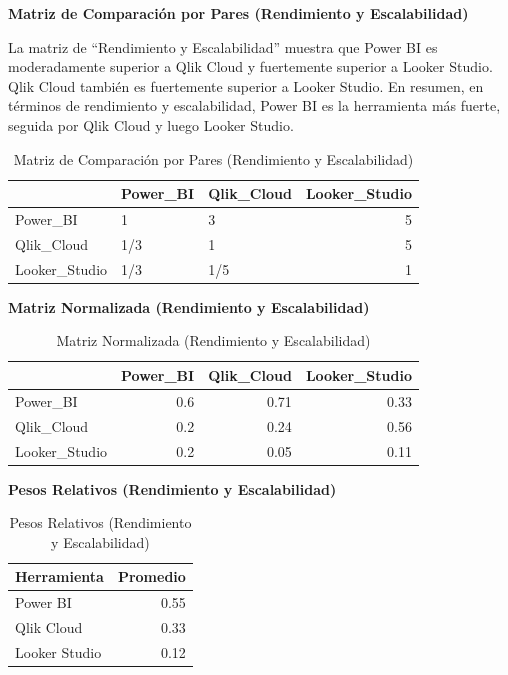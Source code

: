 \documentclass[
  11pt,
  bookmarksnumbered]{article}
\begin{document}
\textbf{Matriz de Comparación por Pares (Rendimiento y Escalabilidad)}

La matriz de ``Rendimiento y Escalabilidad'' muestra que Power BI es moderadamente superior a Qlik Cloud y fuertemente superior a Looker Studio. Qlik Cloud también es fuertemente superior a Looker Studio. En resumen, en términos de rendimiento y escalabilidad, Power BI es la herramienta más fuerte, seguida por Qlik Cloud y luego Looker Studio.

\begin{table}[H]

\caption{\label{tab:unnamed-chunk-45}Matriz de Comparación por Pares (Rendimiento y Escalabilidad)}
\centering
\fontsize{12}{14}\selectfont
\begin{tabular}[t]{l|l|l|r}
\hline
  & Power\_BI & Qlik\_Cloud & Looker\_Studio\\
\hline
Power\_BI & 1 & 3 & 5\\
\hline
Qlik\_Cloud & 1/3 & 1 & 5\\
\hline
Looker\_Studio & 1/3 & 1/5 & 1\\
\hline
\end{tabular}
\end{table}

\textbf{Matriz Normalizada (Rendimiento y Escalabilidad)}

\begin{table}[H]

\caption{\label{tab:unnamed-chunk-46}Matriz Normalizada (Rendimiento y Escalabilidad)}
\centering
\fontsize{12}{14}\selectfont
\begin{tabular}[t]{l|r|r|r}
\hline
  & Power\_BI & Qlik\_Cloud & Looker\_Studio\\
\hline
Power\_BI & 0.6 & 0.71 & 0.33\\
\hline
Qlik\_Cloud & 0.2 & 0.24 & 0.56\\
\hline
Looker\_Studio & 0.2 & 0.05 & 0.11\\
\hline
\end{tabular}
\end{table}

\textbf{Pesos Relativos (Rendimiento y Escalabilidad)}

\begin{table}[H]

\caption{\label{tab:unnamed-chunk-47}Pesos Relativos (Rendimiento y Escalabilidad)}
\centering
\fontsize{12}{14}\selectfont
\begin{tabular}[t]{l|r}
\hline
Herramienta & Promedio\\
\hline
Power BI & 0.55\\
\hline
Qlik Cloud & 0.33\\
\hline
Looker Studio & 0.12\\
\hline
\end{tabular}
\end{table}
\end{document}
